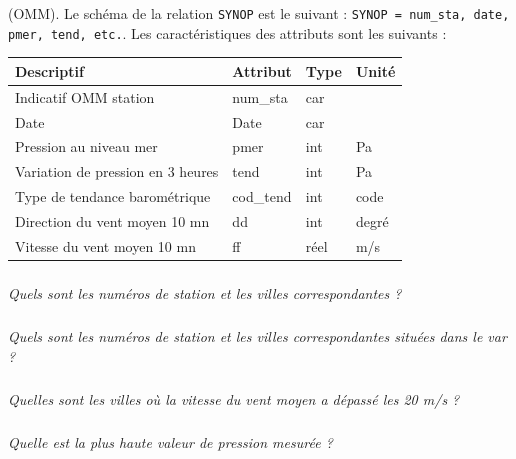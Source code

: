 (OMM). 
Le schéma de la relation \texttt{SYNOP} est le suivant : \texttt{SYNOP = {num\_sta, date, pmer, tend, etc.}}.
Les caractéristiques des attributs sont les suivants :
\begin{center}
\begin{tabular}{llll}
\hline
Descriptif&	Attribut&	Type&	 Unité\\
\hline
\hline
Indicatif OMM station&	num\_sta& car&	\\
Date&	Date	&car&	\\
Pression au niveau mer&	pmer&	int&	Pa\\
Variation de pression en 3 heures&	tend&	int&	Pa\\
Type de tendance barométrique&	cod\_tend&	int&	code\\
Direction du vent moyen 10 mn&	dd&	 int&	degré\\
Vitesse du vent moyen 10 mn&	ff&	réel& 	m/s \\
\hline
\end{tabular}
\end{center}

\subparagraph{}
\textit{Quels sont les numéros de station et les villes correspondantes ? }

\subparagraph{}
\textit{Quels sont les numéros de station et les villes correspondantes situées dans le var ? }

\subparagraph{}
\textit{Quelles sont les villes où la vitesse du vent moyen a dépassé les 20 m/s ? }

\subparagraph{}
\textit{Quelle est la plus haute valeur de pression mesurée ?}
\fi

